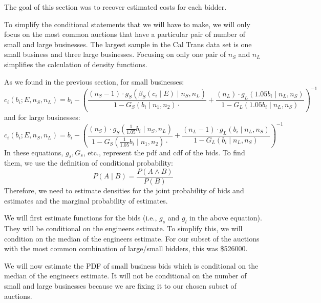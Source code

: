 The goal of this section was to recover estimated costs for each bidder.

To simplify the conditional statements that we will have to make, we will only
focus on the most common auctions that have a particular pair of number of small
and large businesses. The largest sample in the Cal Trans data set is one small business
and three large businesses. %
Focusing on only one pair of \(n_S\) and \(n_L\) simplifies the calculation
of density functions.

As we found in the previous section, for small businesses:
\[
  c_i(b_i; E, n_S, n_L) = b_i - \left(\frac{(n_S - 1) \cdot g_S(\beta_S(c_i \mid E) \mid n_S, n_L)}{1 - G_S(b_i \mid n_1, n_2) \cdot} +
    \frac{(n_L) \cdot g_L(1.05 b_i \mid n_L, n_S)}{1 - G_L(1.05 b_i \mid n_L, n_S)} \right)^{-1}
\]
and for large businesses:
\[ 
  c_i(b_i; E, n_S, n_L) = b_i - \left(\frac{(n_S) \cdot g_S(\frac{1}{1.05} b_i \mid n_S, n_L)}{1 - G_S(\frac{1}{1.05} b_i \mid n_1, n_2) \cdot} +
    \frac{(n_L - 1) \cdot g_L(b_i \mid n_L, n_S)}{1 - G_L(b_i \mid n_L, n_S)} \right)^{-1}
\]
In these equations, \(g_s, G_s\), etc., represent the pdf and cdf of the bids.
To find them, we use the definition of conditional probability:
\[
P(A \mid B) = \frac{P(A \land B)}{P(B)}
\]
Therefore, we need to estimate densities for the joint probability of bids and
estimates and the marginal probability of estimates.

We will first estimate functions for the bids (i.e., \(g_s\) and \(g_l\)
in the above equation). They will be conditional on the engineers estimate.
To simplify this, we will condition on the median of the engineers estimate.
For our subset of the auctions with the most common combination of large/small bidders,
this was \$526000.

We will now estimate the PDF of small business bids which is conditional on the
median of the engineers estimate.
It will not be conditional on the number of small and large businesses because
we are fixing it to our chosen subset of auctions.

